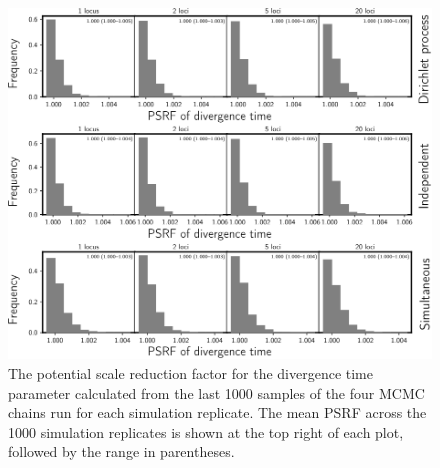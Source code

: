 \begin{figure}[htbp]
    \begin{center}
        \includegraphics[width=\textwidth,height=0.9\textheight,keepaspectratio]{../images/from-project-repo/plots/tex-plot-grids/grid-psrf-div-time-histograms-cropped.pdf}
        \caption{
            The potential scale reduction factor \citep[PSRF; the square root
            of Equation 1.1 in][]{Brooks1998}
            for the divergence time parameter calculated from the last 1000
            samples of the four MCMC chains run for each simulation replicate.
            The mean PSRF across the 1000 simulation replicates is shown at the
            top right of each plot, followed by the range in parentheses.
        }
        \label{fig:psrfdivtime}
    \end{center}
\end{figure}

